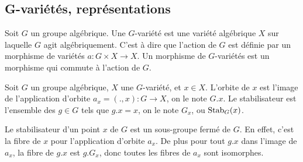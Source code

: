\subsection{G-variétés, représentations}

\begin{defn}[$G$-variété]
Soit $G$ un groupe algébrique. Une $G$-variété est une variété algébrique $X$ sur laquelle $G$ agit algébriquement. C'est à dire que l'action de $G$ est définie par un morphisme de variétés $a:G\times X\rightarrow X$. Un morphisme de $G$-variétés est un morphisme qui commute à l'action de $G$. 
\end{defn}

\begin{defn}
Soit $G$ un groupe algébrique, $X$ une $G$-variété, et $x\in X$. L'orbite de $x$ est l'image de l'application d'orbite $a_x=(.,x):G\rightarrow X$, on le note $G.x$. Le stabilisateur est l'ensemble des $g\in G$ tels que $g.x=x$, on le note $G_x$, ou $\operatorname{Stab}_G(x)$. 
\end{defn}

Le stabilisateur d'un point $x$ de $G$ est un sous-groupe fermé de $G$. En effet, c'est la fibre de $x$ pour l'application d'orbite $a_x$. De plus pour tout $g.x$ dans l'image de $a_x$, la fibre de $g.x$ est $g.G_x$, donc toutes les fibres de $a_x$ sont isomorphes.

